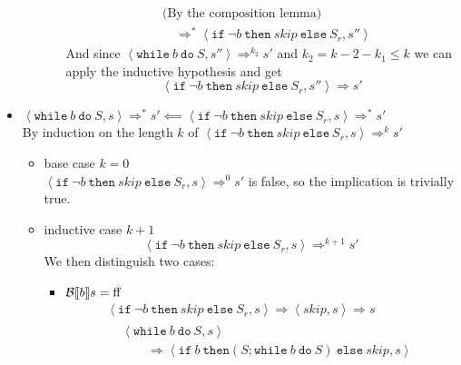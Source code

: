 \begin{exercise}
\begin{itemize}
\begin{itemize}
\begin{itemize}
\begin{align*}
                            \\&\text{(By the composition lemma)}
                            \\&\quad\Rightarrow^* \left<\texttt{if}\ \neg b\ \texttt{then}\ skip\ \texttt{else}\ S_r, s''\right>
                        \end{align*}
                        And since $\left<\texttt{while}\ b\ \texttt{do}\ S, s''\right> \Rightarrow^{k_2} s'$ and $k_2 = k - 2 - k_1 \leq k$  we can apply the inductive hypothesis and get
                        \[ \left<\texttt{if}\ \neg b\ \texttt{then}\ skip\ \texttt{else}\ S_r, s''\right> \Rightarrow s' \]
                \end{itemize}
            \end{itemize}
        \item $\left<\texttt{while}\ b\ \texttt{do}\ S, s\right> \Rightarrow^* s' \impliedby \left<\texttt{if}\ \neg b\ \texttt{then}\ skip\ \texttt{else}\ S_r, s\right> \Rightarrow^* s'$ \\
            By induction on the length $k$ of $\left<\texttt{if}\ \neg b\ \texttt{then}\ skip\ \texttt{else}\ S_r, s\right> \Rightarrow^k s'$
            \begin{itemize}
                \item base case $k=0$ \\
                $\left<\texttt{if}\ \neg b\ \texttt{then}\ skip\ \texttt{else}\ S_r, s\right> \Rightarrow^0 s'$ is false, so the implication is trivially true.
                \item inductive case $k+1$ \vspace*{-0.3cm}
                \[ \left<\texttt{if}\ \neg b\ \texttt{then}\ skip\ \texttt{else}\ S_r, s\right> \Rightarrow^{k+1} s' \]
                We then distinguish two cases:
                \begin{itemize}
                    \item $\mathcal{B} \llbracket  b \rrbracket s = \text{ff}$
                    \begin{gather*}
                        \left<\texttt{if}\ \neg b\ \texttt{then}\ skip\ \texttt{else}\ S_r, s\right>
                        \Rightarrow
                        \left<skip, s\right>
                        \Rightarrow s
                        \\
                        \begin{align*}
                            &\left<\texttt{while}\ b\ \texttt{do}\ S, s\right>
                            \\&\qquad\Rightarrow \left<\texttt{if}\ b\ \texttt{then} (S; \texttt{while}\ b\ \texttt{do}\ S)\ \texttt{else}\ skip, s\right>

\end{align*}
\end{gather*}
\end{itemize}
\end{itemize}
\end{itemize}
\end{exercise}
